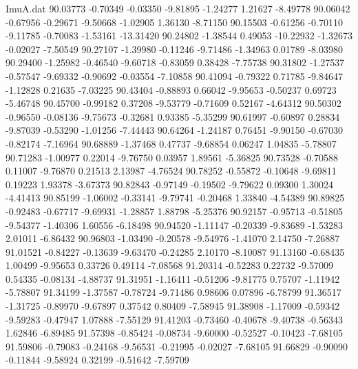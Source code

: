 \begin{filecontents}{ImuA.dat}
  90.03773   -0.70349   -0.03350   -9.81895   -1.24277    1.21627   -8.49778
  90.06042   -0.67956   -0.29671   -9.50668   -1.02905    1.36130   -8.71150
  90.15503   -0.61256   -0.70110   -9.11785   -0.70083   -1.53161  -13.31420
  90.24802   -1.38544    0.49053  -10.22932   -1.32673   -0.02027   -7.50549
  90.27107   -1.39980   -0.11246   -9.71486   -1.34963    0.01789   -8.03980
  90.29400   -1.25982   -0.46540   -9.60718   -0.83059    0.38428   -7.75738
  90.31802   -1.27537   -0.57547   -9.69332   -0.90692   -0.03554   -7.10858
  90.41094   -0.79322    0.71785   -9.84647   -1.12828    0.21635   -7.03225
  90.43404   -0.88893    0.66042   -9.95653   -0.50237    0.69723   -5.46748
  90.45700   -0.99182    0.37208   -9.53779   -0.71609    0.52167   -4.64312
  90.50302   -0.96550   -0.08136   -9.75673   -0.32681    0.93385   -5.35299
  90.61997   -0.60897    0.28834   -9.87039   -0.53290   -1.01256   -7.44443
  90.64264   -1.24187    0.76451   -9.90150   -0.67030   -0.82174   -7.16964
  90.68889   -1.37468    0.47737   -9.68854    0.06247    1.04835   -5.78807
  90.71283   -1.00977    0.22014   -9.76750    0.03957    1.89561   -5.36825
  90.73528   -0.70588    0.11007   -9.76870    0.21513    2.13987   -4.76524
  90.78252   -0.55872   -0.10648   -9.69811    0.19223    1.93378   -3.67373
  90.82843   -0.97149   -0.19502   -9.79622    0.09300    1.30024   -4.41413
  90.85199   -1.06002   -0.33141   -9.79741   -0.20468    1.33840   -4.54389
  90.89825   -0.92483   -0.67717   -9.69931   -1.28857    1.88798   -5.25376
  90.92157   -0.95713   -0.51805   -9.54377   -1.40306    1.60556   -6.18498
  90.94520   -1.11147   -0.20339   -9.83689   -1.53283    2.01011   -6.86432
  90.96803   -1.03490   -0.20578   -9.54976   -1.41070    2.14750   -7.26887
  91.01521   -0.84227   -0.13639   -9.63470   -0.24285    2.10170   -8.10087
  91.13160   -0.68435    1.00499   -9.95653    0.33726    0.49114   -7.08568
  91.20314   -0.52283    0.22732   -9.57009    0.54335   -0.08134   -4.88737
  91.31951   -1.16411   -0.51206   -9.81775    0.75707   -1.11942   -5.78807
  91.34199   -1.37587   -0.78724   -9.71486    0.98606    0.07896   -6.78799
  91.36517   -1.31725   -0.89970   -9.67897    0.37542    0.80409   -7.58945
  91.38908   -1.17009   -0.59342   -9.59283   -0.47947    1.07888   -7.55129
  91.41203   -0.73460   -0.40678   -9.40738   -0.56343    1.62846   -6.89485
  91.57398   -0.85424   -0.08734   -9.60000   -0.52527   -0.10423   -7.68105
  91.59806   -0.79083   -0.24168   -9.56531   -0.21995   -0.02027   -7.68105
  91.66829   -0.90090   -0.11844   -9.58924    0.32199   -0.51642   -7.59709

\end{filecontents}
